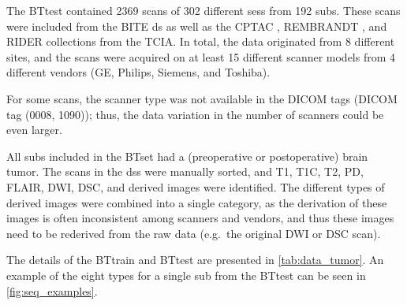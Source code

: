 The \gls{BTtest} contained \num{2369} \glspl{scan} of \num{302} different \glspl{ses} from \num{192} \glspl{sub}.
These \glspl{scan} were included from the \gls{BITE} \gls{ds} \autocite{mercier2012online} as well as the \gls{CPTAC} \autocite*{cptac2018radiology}, \gls{REMBRANDT} \autocite{scarpace2015radiology}, and \gls{RIDER} \autocite{barboriak2015radiology} collections from the \gls{TCIA}.
In total, the data originated from \num{8} different \glspl{site}, and the \glspl{scan} were acquired on at least \num{15} different scanner models from \num{4} different vendors (GE, Philips, Siemens, and Toshiba).

For some \glspl{scan}, the scanner type was not available in the \gls{DICOM} tags (\gls{DICOM} tag (0008, 1090)); thus, the data variation in the number of scanners could be even larger.

All \glspl{sub} included in the \gls{BTset} had a (preoperative or postoperative) brain \gls{tumor}.
The \glspl{scan} in the \glspl{ds} were manually sorted, and \gls{T1}, \gls{T1C}, \gls{T2}, \gls{PD}, \gls{FLAIR}, \gls{DWI}, \gls{DSC}, and derived images were identified.
The different types of derived images were combined into a single category, as the derivation of these images is often inconsistent among scanners and vendors, and thus these images need to be rederived from the raw data (e.g.\ the original \gls{DWI} or \gls{DSC} \gls{scan}).

The details of the \gls{BTtrain} and \gls{BTtest} are presented in \cref{tab:data_tumor}.
An example of the eight \glspl{type} for a single \gls{sub} from the \gls{BTtest} can be seen in \cref{fig:seq_examples}.

